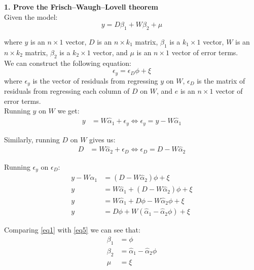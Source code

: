 \documentclass[a4paper, 11pt]{article}
\begin{document}
\textbf{1. Prove the Frisch–Waugh–Lovell theorem} \\

Given the model:
\begin{equation}
    y = D \beta_1 + W \beta_2 + \mu \label{eq1}
\end{equation}

where \(y\) is an \(n \times 1\) vector, \(D\) is an \(n \times k_1\) matrix, \(\beta_1\) is a \(k_1 \times 1\) vector, \(W\) is an \(n \times k_2\) matrix, \(\beta_2\) is a \(k_2 \times 1\) vector, and \(\mu\) is an \(n \times 1\) vector of error terms. \\

We can construct the following equation:
\begin{equation}
    \epsilon_y = \epsilon_D \phi + \xi
\end{equation}
where \(\epsilon_y\) is the vector of residuals from regressing \(y\) on \(W\), \(\epsilon_D\) is the matrix of residuals from regressing each column of \(D\) on \(W\), and \(e\) is an \(n \times 1\) vector of error terms. \\

Running \(y\) on \(W\) we get:
\begin{align}
    y &= W\hat{\alpha}_1 + \epsilon_y \iff \epsilon_y = y - W\hat{\alpha}_1
\end{align}

Similarly, running \(D\) on \(W\) gives us:
\begin{align}
    D &= W\hat{\alpha}_2 + \epsilon_D \iff \epsilon_D = D - W\hat{\alpha}_2
\end{align}

Running \(\epsilon_y\) on \(\epsilon_D\):
\begin{align}
    y - W \hat{\alpha}_1 &= (D - W \hat{\alpha}_2) \phi + \xi \nonumber \\
    y &= W \hat{\alpha}_1 + (D - W \hat{\alpha}_2) \phi + \xi \nonumber \\
    y &= W \hat{\alpha}_1 + D \phi - W \hat{\alpha}_2 \phi + \xi \nonumber \\
    y &= D \phi + W (\hat{\alpha}_1 - \hat{\alpha}_2 \phi) + \xi \label{eq5}
\end{align}

Comparing \eqref{eq1} with \eqref{eq5} we can see that:
\begin{align}
    \beta_1 &= \phi \\
    \beta_2 &= \hat{\alpha}_1 - \hat{\alpha}_2 \phi \\
    \mu &= \xi
\end{align}
\end{document}
